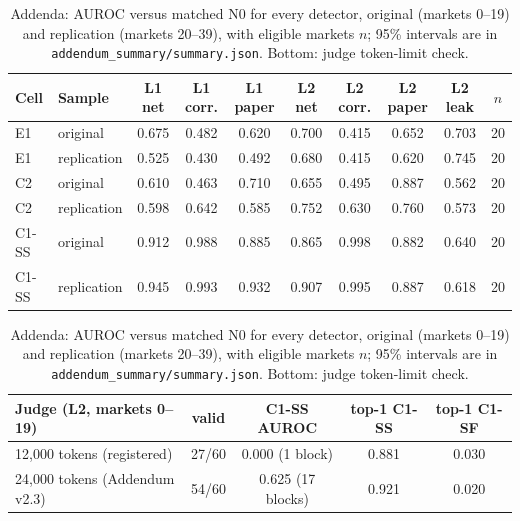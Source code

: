 \begin{table}[htbp]
\centering\small
\setlength{\tabcolsep}{3pt}
\caption{Addenda: AUROC versus matched N0 for every detector, original (markets 0--19) and replication (markets 20--39), with eligible markets $n$; 95\% intervals are in \texttt{addendum\_summary/summary.json}. Bottom: judge token-limit check.}
\label{tab:addendum_full}
\begin{tabular}{llcccccccc}
\toprule
Cell & Sample & L1 net & L1 corr. & L1 paper & L2 net & L2 corr. & L2 paper & L2 leak & $n$\\
\midrule
E1 & original & 0.675 & 0.482 & 0.620 & 0.700 & 0.415 & 0.652 & 0.703 & 20\\
E1 & replication & 0.525 & 0.430 & 0.492 & 0.680 & 0.415 & 0.620 & 0.745 & 20\\
C2 & original & 0.610 & 0.463 & 0.710 & 0.655 & 0.495 & 0.887 & 0.562 & 20\\
C2 & replication & 0.598 & 0.642 & 0.585 & 0.752 & 0.630 & 0.760 & 0.573 & 20\\
C1-SS & original & 0.912 & 0.988 & 0.885 & 0.865 & 0.998 & 0.882 & 0.640 & 20\\
C1-SS & replication & 0.945 & 0.993 & 0.932 & 0.907 & 0.995 & 0.887 & 0.618 & 20\\
\bottomrule
\end{tabular}
\par\medskip
\begin{tabular}{lcccc}
\toprule
Judge (L2, markets 0--19) & valid & C1-SS AUROC & top-1 C1-SS & top-1 C1-SF\\
\midrule
12,000 tokens (registered) & 27/60 & 0.000 (1 block) & 0.881 & 0.030\\
24,000 tokens (Addendum v2.3) & 54/60 & 0.625 (17 blocks) & 0.921 & 0.020\\
\bottomrule
\end{tabular}
\end{table}
